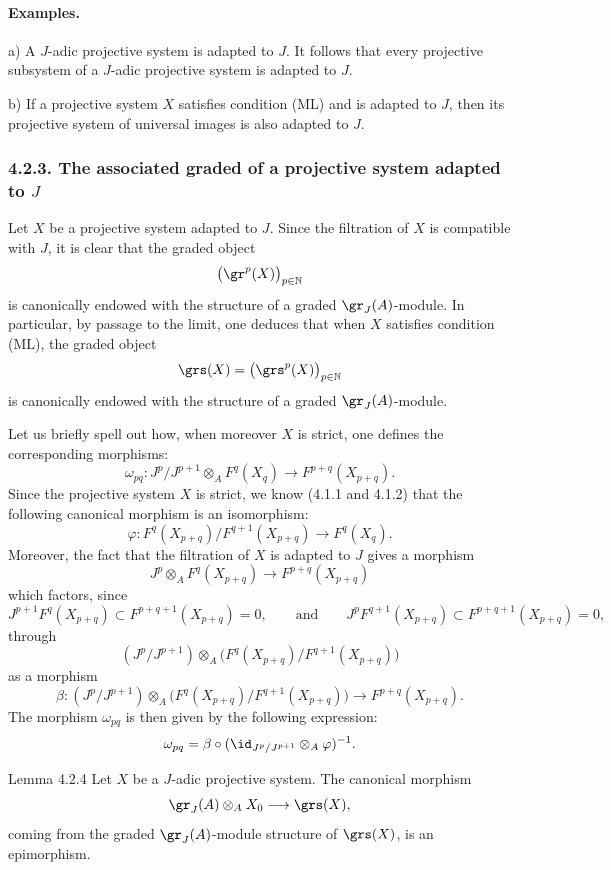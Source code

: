 \paragraph{Examples.}
a) A \(J\)-adic projective system is adapted to \(J\). It follows that every projective subsystem of a \(J\)-adic projective system is adapted to \(J\).

b) If a projective system \(X\) satisfies condition (ML) and is adapted to \(J\), then its projective system of universal images is also adapted to \(J\).

\subsubsection*{4.2.3. The associated graded of a projective system adapted to \(J\)}
Let \(X\) be a projective system adapted to \(J\). Since the filtration of \(X\) is compatible with \(J\), it is clear that the graded object
\[
\bigl(\gr^p(X)\bigr)_{p\in\mathbb N}
\]
is canonically endowed with the structure of a graded \(\gr_J(A)\)-module. In particular, by passage to the limit, one deduces that when \(X\) satisfies condition (ML), the graded object
\[
\grs(X)=\bigl(\grs^p(X)\bigr)_{p\in\mathbb N}
\]
is canonically endowed with the structure of a graded \(\gr_J(A)\)-module.

Let us briefly spell out how, when moreover \(X\) is strict, one defines the corresponding morphisms:
\[
\omega_{pq}: J^p/J^{p+1}\otimes_A F^q(X_q)\longrightarrow F^{p+q}(X_{p+q}).
\]
Since the projective system \(X\) is strict, we know (4.1.1 and 4.1.2) that the following canonical morphism is an isomorphism:
\[
\varphi:F^q(X_{p+q})/F^{q+1}(X_{p+q})\longrightarrow F^q(X_q).
\]
Moreover, the fact that the filtration of \(X\) is adapted to \(J\) gives a morphism
\[
J^p\otimes_A F^q(X_{p+q})\longrightarrow F^{p+q}(X_{p+q})
\]
which factors, since
\[
J^{p+1}F^q(X_{p+q})\subset F^{p+q+1}(X_{p+q})=0,\qquad\text{and}\qquad
J^pF^{q+1}(X_{p+q})\subset F^{p+q+1}(X_{p+q})=0,
\]
through
\[
(J^p/J^{p+1})\otimes_A
\bigl(F^q(X_{p+q})/F^{q+1}(X_{p+q})\bigr)
\]
as a morphism
\[
\beta:(J^p/J^{p+1})\otimes_A
\bigl(F^q(X_{p+q})/F^{q+1}(X_{p+q})\bigr)
\longrightarrow F^{p+q}(X_{p+q}).
\]
The morphism \(\omega_{pq}\) is then given by the following expression:
\[
\omega_{pq}=\beta\circ(\id_{J^p/J^{p+1}}\otimes_A\varphi)^{-1}.
\]

\begin{statement}{Lemma 4.2.4}
Let \(X\) be a \(J\)-adic projective system. The canonical morphism
\[
\gr_J(A)\otimes_A X_0\longrightarrow \grs(X),
\]
coming from the graded \(\gr_J(A)\)-module structure of \(\grs(X)\), is an epimorphism.
\end{statement}


